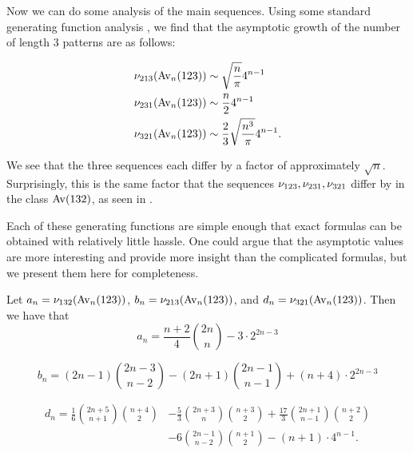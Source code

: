   Now we can do some analysis of the main sequences. Using some
  standard generating function analysis \cite{flajolet}, we find
  that the asymptotic growth of the number of length $3$ patterns are
  as follows:

  \vspace{1pc}

  $$ \begin{aligned}
   \nu_{213} (\operatorname{{Av}}_n(123)) &\sim \sqrt{\frac{n}{\pi}} 4^{n-1} \\
   \nu_{231} (\operatorname{{Av}}_n(123)) &\sim \frac{n}{2} 4^{n-1}  \\
   \nu_{321} (\operatorname{{Av}}_n(123)) &\sim \frac{2}{3} \sqrt{\frac{n^3}{\pi}} 4^{n-1}. 
  \end{aligned} $$

  We see that the three sequences each differ by a factor of
  approximately $\sqrt{n}$. Surprisingly, this is the same factor that
  the sequences $\nu_{123}, \nu_{231}, \nu_{321}$ differ by in the
  class $\operatorname{{Av}} (132)$, as seen in \cite{Bona2012}.

  Each of these generating functions are simple enough that exact
  formulas can be obtained with relatively little hassle. One could
  argue that the asymptotic values are more interesting and
  provide more insight than the complicated formulas, but we present
  them here for completeness.

  \begin{corollary}
    Let $a_n = \nu_{132}(\operatorname{{Av}}_n(123))$, $b_n = \nu_{213}(\operatorname{{Av}}_n(123))$, and $d_n =
    \nu_{321}(\operatorname{{Av}}_n(123))$. Then we have that
    $$ a_n = \frac{n+2}{4} \binom{2n}{n} - 3 \cdot 2^{2n-3} $$

    \vspace{1pc}

    $$ b_n = (2n-1) \binom{2n-3}{n-2} - (2n+1)\binom{2n-1}{n-1} +
       (n+4) \cdot 2^{2n-3}$$
    
    \vspace{1pc}

    $$ \begin{aligned} d_n
        = \frac{1}{6} \binom{2n+5}{n+1} \binom{n+4}{2}
        &- \frac{5}{3} \binom{2n+3}{n} \binom{n+3}{2}
        + \frac{17}{3} \binom{2n+1}{n-1} \binom{n+2}{2} \\
        &- 6\binom{2n-1}{n-2} \binom{n+1}{2} - (n+1) \cdot 4^{n-1}.
      \end{aligned}
    $$
  \end{corollary}

 


